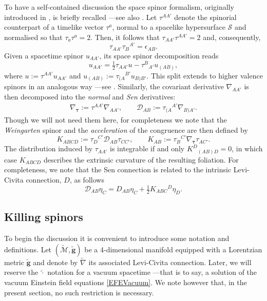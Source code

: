 \documentclass[10pt,a4paper]{article}
\theoremstyle{plain}
\def\bmg{{\bm g}}
\begin{document}
To have a self-contained discussion the space spinor
formalism, originally introduced in \cite{Som80}, is briefly recalled
---see also \cite{GarVal08c,BaeVal10b,CFEbook}.  Let $\tau^{AA'}$
denote the spinorial counterpart of a timelike vector $\tau^{a}$,
normal to a spacelike hypersurface $\mathcal{S}$ and normalised so
that $\tau_{a}\tau^{a}=2$.  Then, it follows that
$\tau_{AA'}\tau^{AA'}=2$ and, consequently,
\[\tau_{AA'}\tau_B{}^{A'}=\epsilon_{AB}.\]
Given a spacetime spinor $u_{AA'}$, its space spinor decomposition
reads
\[
u_{AA'}= \tfrac{1}{2}\tau_{AA'}u-\tau^{B}{}_{A'}u_{(AB)},
\]
where $u:=\tau^{AA'}u_{AA'}$ and $u_{(AB)}:=\tau_{(A}{}^{B'}u_{B)B'}$.
This split extends to higher valence spinors in an analogous way
---see \cite{GarVal08c,BaeVal10b,CFEbook}. Similarly, the covariant
derivative $\nabla_{AA'}$ is then decomposed into the \emph{normal}
and \emph{Sen} derivatives:
\begin{align*}
  \nabla_{\bm\tau} := \tau^{AA'}\nabla_{AA'},\qquad \mathcal{D}_{AB}:=
  \tau_{(A}{}^{A'}\nabla_{B)A'}.
\end{align*}
Though we will not need them here, for completeness we note that the
\emph{Weingarten} spinor and the \emph{acceleration} of the congruence
are then defined by
\[K_{ABCD} := \tau_{D}{}^{C'} \mathcal{D}_{AB}\tau_{CC'},\qquad K_{AB} := \tau_{B}{}^{C'} \nabla_{\bm\tau}\tau_{AC'}.
\]
The distribution induced by $\tau_{AA'}$ is integrable if and only
$K^D{}_{(AB)D}=0$, in which case $K_{ABCD}$ describes the extrinsic
curvature of the resulting foliation.
For completeness, we note that the Sen connection is related to the
intrinsic Levi-Civita connection, $D$, as follows
\[\mathcal{D}_{AB}\eta_C = D_{AB}\eta_C + \tfrac{1}{2}K_{ABC}{}^D\eta_D. \]

\subsection{Killing spinors}\label{Sec:KillingSpinors}

To begin the discussion it is convenient to introduce some notation
and definitions. Let $(\tilde{\mathcal{M}},\tilde{\bmg})$ be a
4-dimensional manifold equipped with a Lorentzian metric
$\tilde{\bmg}$ and denote by $\tilde{\nabla}$ its associated
Levi-Civita connection.  Later, we will reserve the $\tilde{\cdot}$
notation for a vacuum spacetime ---that is to say, a solution of the
vacuum Einstein field equations \eqref{EFEVacuum}. We note however
that, in the present section, no such restriction is necessary.
\medskip
\end{document}
